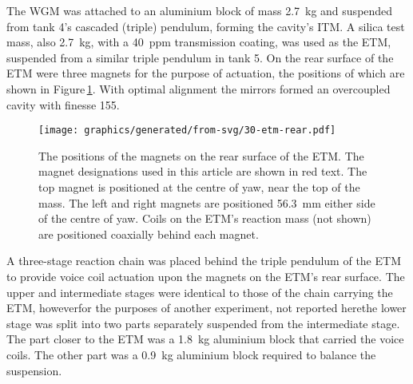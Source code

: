 The \gls{WGM} was attached to an aluminium block of mass \SI{2.7}{\kilo\gram} and suspended from tank 4's cascaded (triple) pendulum, forming the cavity's \gls{ITM}. A silica test mass, also \SI{2.7}{\kilo\gram}, with a \SI{40}{ppm} transmission coating, was used as the \gls{ETM}, suspended from a similar triple pendulum in tank 5. On the rear surface of the \gls{ETM} were three magnets for the purpose of actuation, the positions of which are shown in Figure\,\ref{fig:etm-rear}. With optimal alignment the mirrors formed an overcoupled cavity with finesse \num{155}.

\begin{figure}
  \centering
  \texttt{[image: graphics/generated/from-svg/30-etm-rear.pdf]}
  \caption{\label{fig:etm-rear}The positions of the magnets on the rear surface of the \gls{ETM}. The magnet designations used in this article are shown in red text. The top magnet is positioned at the centre of yaw, near the top of the mass. The left and right magnets are positioned \SI{56.3}{\milli\meter} either side of the centre of yaw. Coils on the \gls{ETM}'s reaction mass (not shown) are positioned coaxially behind each magnet.}
\end{figure}

A three-stage reaction chain was placed behind the triple pendulum of the \gls{ETM} to provide voice coil actuation upon the magnets on the \gls{ETM}'s rear surface. The upper and intermediate stages were identical to those of the chain carrying the \gls{ETM}, however\textemdash for the purposes of another experiment, not reported here\textemdash the lower stage was split into two parts separately suspended from the intermediate stage. The part closer to the \gls{ETM} was a \SI{1.8}{\kilo\gram} aluminium block that carried the voice coils. The other part was a \SI{0.9}{\kilo\gram} aluminium block required to balance the suspension.

